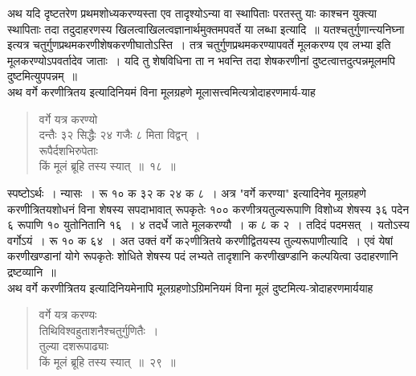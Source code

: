 \documentclass[11pt, openany]{book}
\begin{document}
\vspace{-3mm} 
 अथ यदि दृष्टतरेण प्रथमशोध्यकरण्यस्ता एव तादृश्योऽन्या वा 
स्थापिताः परतस्तु याः काश्चन युक्त्या स्थापिताः तदा तदुदाहरणस्य
खिलत्वाखिलत्वज्ञानार्थमुक्तमपवर्ते या लब्धा इत्यादि~॥
यतश्चतुर्गुणान्त्यनिघ्ना इत्यत्र चतुर्गुणप्रथमकरणीशेषकरणीघातोऽस्ति~। तत्र
चतुर्गुणप्रथमकरण्यापवर्ते मूलकरण्य एव लभ्या इति मूलकरण्योऽपवर्तादेव जाताः~। यदि तु शेषविधिना ता न भवन्ति तदा शेषकरणीनां दुष्टत्वात्तदुत्पन्नमूलमपि दुष्टमित्युपपन्नम्~॥ \\

\vspace{-3mm} 
 अथ वर्गे करणीत्रितय इत्यादिनियमं विना मूलग्रहणे मूलासत्त्वमित्यत्रोदाहरणमार्य-याह\textendash 
\begin{quote}
    \ex
     वर्गे यत्र करण्यो \\

\vspace{-7mm}
\hspace{1cm} दन्तैः ३२ सिद्धैः २४ गजैः ८ मिता विद्वन्~। \\

\vspace{-7mm}
 रूपैर्दशभिरुपेताः \\

\vspace{-7mm}
\hspace{1cm} किं मूलं ब्रूहि तस्य स्यात्~॥~१८~॥\\

\end{quote}
\newpage%

 स्पष्टोऽर्थः~। न्यासः~। रू १० क ३२ क २४ क ८~। अत्र {\qt "वर्गे 
करण्या"} इत्यादिनेव मूलग्रहणे करणीत्रितयशोधनं विना शेषस्य
सपदाभावात् रूपकृतेः १०० करणीत्रयतुल्यरूपाणि विशोध्य शेषस्य ३६ पदेन ६ 
रूपाणि १० युतोनितानि १६~। ४ तदर्धे जाते मूलकरण्यौ~। क ८ क २~। 
तदिदं पदमसत्~। यतोऽस्य वर्गोऽयं~। रू १० क ६४~। अत उक्तं 
वर्गे क२णीत्रितये करणीद्वितयस्य तुल्यरूपाणीत्यादि~। एवं येषां 
करणीखण्डानां योगे रूपकृतेः शोधिते शेषस्य पदं लभ्यते तादृशानि 
करणीखण्डानि कल्पयित्वा उदाहरणानि द्रष्टव्यानि~॥ \\

\vspace{-3mm}
 अथ वर्गे करणीत्रितय इत्यादिनियमेनापि मूलग्रहणोऽग्रिमनियमं 
विना मूलं दुष्टमित्य-त्रोदाहरणमार्ययाह\textendash 

 \label{ex 29}
\begin{quote}
    \ex
     वर्गे यत्र करण्यः \\

\vspace{-7mm}
\hspace{1cm} तिथिविश्वहुताशनैश्चतुर्गुणितैः~। \\

\vspace{-7mm}
 तुल्या दशरूपाढ्याः \\

\vspace{-7mm}
\hspace{1cm} किं मूलं ब्रूहि तस्य स्यात्~॥~२९~॥ 

\end{quote}
\end{document}
